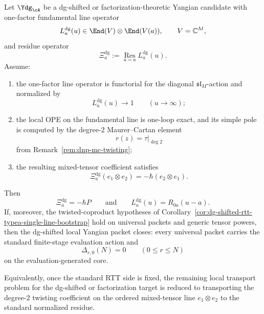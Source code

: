 \begin{proposition}
\label{prop:dg-shifted-rtt-degree2-mixed-tensor-criterion}
Let $\Ydg_{\cA}$ be a dg-shifted or factorization-theoretic Yangian
candidate with one-factor fundamental line operator
\[
L_a^{\mathrm{dg}}(u)\in \End(V)\otimes \End(V(a)),
\qquad V=\mathbb{C}^M,
\]
and residue operator
\[
\Xi_a^{\mathrm{dg}}
:=
\operatorname*{Res}_{u=a}L_a^{\mathrm{dg}}(u).
\]
Assume:
\begin{enumerate}[label=\textup{(\roman*)}]
\item the one-factor line operator is functorial for the diagonal
  $\mathfrak{sl}_M$-action and normalized by
  \[
  L_a^{\mathrm{dg}}(u)\to 1
  \qquad (u\to\infty);
  \]
\item the local OPE on the fundamental line is one-loop exact, and its
  simple pole is computed by the degree-$2$ Maurer--Cartan element
  \[
  r(z)=\tau|_{\deg 2}
  \]
  from Remark~\ref{rem:dnp-mc-twisting};
\item the resulting mixed-tensor coefficient satisfies
  \[
  \Xi_a^{\mathrm{dg}}(e_1\otimes e_2)
  =-\hbar(e_2\otimes e_1).
  \]
\end{enumerate}
Then
\[
\Xi_a^{\mathrm{dg}}=-\hbar P
\qquad\text{and}\qquad
L_a^{\mathrm{dg}}(u)=R_{0a}(u-a).
\]
If, moreover, the twisted-coproduct hypotheses of
Corollary~\ref{cor:dg-shifted-rtt-typea-single-line-bootstrap} hold on
universal packets and generic tensor powers, then the dg-shifted local
Yangian packet closes: every universal packet carries the standard
finite-stage evaluation action and
\[
\Delta_{r,0}(N)=0
\qquad (0\le r\le N)
\]
on the evaluation-generated core.

Equivalently, once the standard RTT side is fixed, the remaining local
transport problem for the dg-shifted or factorization target is reduced
to transporting the degree-$2$ twisting coefficient on the ordered
mixed-tensor line $e_1\otimes e_2$ to the standard normalized residue.
\end{proposition}

